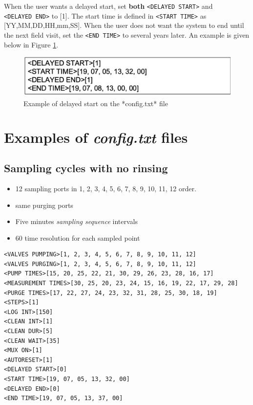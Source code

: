 \documentclass[]{book}
\providecommand{\tightlist}{%
  \setlength{\itemsep}{0pt}\setlength{\parskip}{0pt}}
\begin{document}
When the user wants a delayed start, set \textbf{both} \texttt{\textless{}DELAYED\ START\textgreater{}} and \texttt{\textless{}DELAYED\ END\textgreater{}} to {[}1{]}. The start time is defined in \texttt{\textless{}START\ TIME\textgreater{}} as {[}YY,MM,DD,HH,mm,SS{]}. When the user does not want the system to end until the next field visit, set the \texttt{\textless{}END\ TIME\textgreater{}} to several years later. An example is given below in Figure \ref{fig:ConfigDelay}.

\begin{figure}

\includegraphics[width=0.5\linewidth]{pictures/ConfigDelay} \hfill{}

\caption{Example of delayed start on the *config.txt* file}\label{fig:ConfigDelay}
\end{figure}

\hypertarget{examples-of-config.txt-files}{%
\section{\texorpdfstring{Examples of \emph{config.txt} files}{Examples of config.txt files}}\label{examples-of-config.txt-files}}

\hypertarget{sampling-cycles-with-no-rinsing}{%
\subsection{Sampling cycles with no rinsing}\label{sampling-cycles-with-no-rinsing}}

\begin{itemize}
\tightlist
\item
  12 sampling ports in 1, 2, 3, 4, 5, 6, 7, 8, 9, 10, 11, 12 order.
\item
  same purging ports
\item
  Five minutes \emph{sampling sequence} intervals
\item
  60 time resolution for each sampled point
\end{itemize}

\begin{verbatim}
<VALVES PUMPING>[1, 2, 3, 4, 5, 6, 7, 8, 9, 10, 11, 12]
<VALVES PURGING>[1, 2, 3, 4, 5, 6, 7, 8, 9, 10, 11, 12]
<PUMP TIMES>[15, 20, 25, 22, 21, 30, 29, 26, 23, 28, 16, 17]
<MEASUREMENT TIMES>[30, 25, 20, 23, 24, 15, 16, 19, 22, 17, 29, 28]
<PURGE TIMES>[17, 22, 27, 24, 23, 32, 31, 28, 25, 30, 18, 19]
<STEPS>[1]
<LOG INT>[150]
<CLEAN INT>[1]
<CLEAN DUR>[5]
<CLEAN WAIT>[35]
<MUX ON>[1]
<AUTORESET>[1]
<DELAYED START>[0]
<START TIME>[19, 07, 05, 13, 32, 00]
<DELAYED END>[0]
<END TIME>[19, 07, 05, 13, 37, 00]
\end{verbatim}
\end{document}
